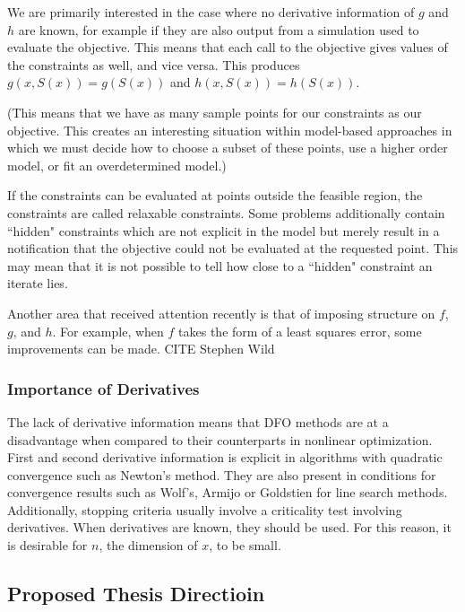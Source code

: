 \documentclass{article}
\begin{document}
We are primarily interested in the case where no derivative information of $g$ and $h$ are known, for example if they are also output from a simulation used to evaluate the objective.
This means that each call to the objective gives values of the constraints as well, and vice versa.
This produces $g(x, S(x))=g(S(x))$ and $h(x,S(x))=h(S(x))$.

\color{blue}
(This means that we have as many sample points for our constraints as our objective.
This creates an interesting situation within model-based approaches in which we must decide how to choose a subset of these points, use a higher order model, or fit an overdetermined model.)
\color{black}


If the constraints can be evaluated at points outside the feasible region, the constraints are called relaxable constraints.
Some problems additionally contain ``hidden" constraints which are not explicit in the model but merely result in a notification that the objective could not be evaluated at the requested point.
This may mean that it is not possible to tell how close to a ``hidden" constraint an iterate lies.


Another area that received attention recently is that of imposing structure on $f$, $g$, and $h$.
For example, when $f$ takes the form of a least squares error, some improvements can be made. CITE Stephen Wild




\subsubsection{Importance of Derivatives}

The lack of derivative information means that DFO methods are at a disadvantage when compared to their counterparts in nonlinear optimization.
First and second derivative information is explicit in algorithms with quadratic convergence such as Newton's method.
They are also present in conditions for convergence results such as Wolf's, Armijo or Goldstien for line search methods.
Additionally, stopping criteria usually involve a criticality test involving derivatives.
When derivatives are known, they should be used.
For this reason, it is desirable for $n$, the dimension of $x$, to be small.


\subsection{Proposed Thesis Directioin}
\end{document}
